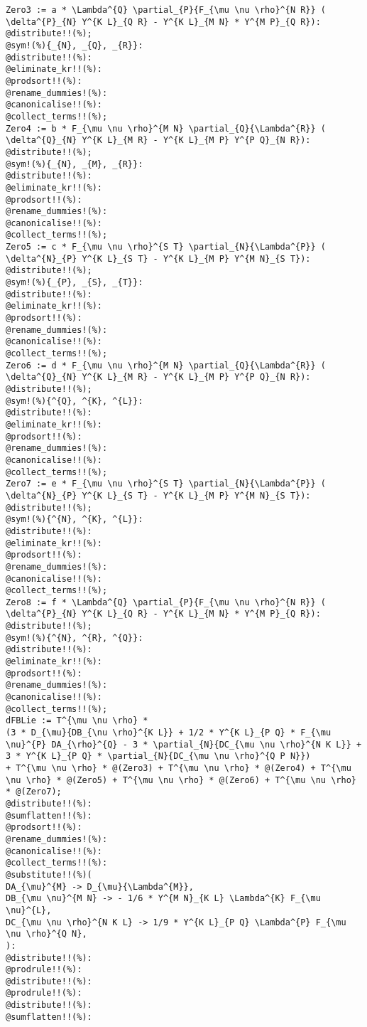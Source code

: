 \documentclass[11pt]{article}
\begin{document}
{\color[named]{Blue}\begin{verbatim}
Zero3 := a * \Lambda^{Q} \partial_{P}{F_{\mu \nu \rho}^{N R}} ( \delta^{P}_{N} Y^{K L}_{Q R} - Y^{K L}_{M N} * Y^{M P}_{Q R}):
@distribute!!(%);
@sym!(%){_{N}, _{Q}, _{R}}:
@distribute!!(%):
@eliminate_kr!!(%):
@prodsort!!(%):
@rename_dummies!(%):
@canonicalise!!(%):
@collect_terms!!(%);
Zero4 := b * F_{\mu \nu \rho}^{M N} \partial_{Q}{\Lambda^{R}} ( \delta^{Q}_{N} Y^{K L}_{M R} - Y^{K L}_{M P} Y^{P Q}_{N R}):
@distribute!!(%);
@sym!(%){_{N}, _{M}, _{R}}:
@distribute!!(%):
@eliminate_kr!!(%):
@prodsort!!(%):
@rename_dummies!(%):
@canonicalise!!(%):
@collect_terms!!(%);
Zero5 := c * F_{\mu \nu \rho}^{S T} \partial_{N}{\Lambda^{P}} ( \delta^{N}_{P} Y^{K L}_{S T} - Y^{K L}_{M P} Y^{M N}_{S T}):
@distribute!!(%);
@sym!(%){_{P}, _{S}, _{T}}:
@distribute!!(%):
@eliminate_kr!!(%):
@prodsort!!(%):
@rename_dummies!(%):
@canonicalise!!(%):
@collect_terms!!(%);
Zero6 := d * F_{\mu \nu \rho}^{M N} \partial_{Q}{\Lambda^{R}} ( \delta^{Q}_{N} Y^{K L}_{M R} - Y^{K L}_{M P} Y^{P Q}_{N R}):
@distribute!!(%);
@sym!(%){^{Q}, ^{K}, ^{L}}:
@distribute!!(%):
@eliminate_kr!!(%):
@prodsort!!(%):
@rename_dummies!(%):
@canonicalise!!(%):
@collect_terms!!(%);
Zero7 := e * F_{\mu \nu \rho}^{S T} \partial_{N}{\Lambda^{P}} ( \delta^{N}_{P} Y^{K L}_{S T} - Y^{K L}_{M P} Y^{M N}_{S T}):
@distribute!!(%);
@sym!(%){^{N}, ^{K}, ^{L}}:
@distribute!!(%):
@eliminate_kr!!(%):
@prodsort!!(%):
@rename_dummies!(%):
@canonicalise!!(%):
@collect_terms!!(%);
Zero8 := f * \Lambda^{Q} \partial_{P}{F_{\mu \nu \rho}^{N R}} ( \delta^{P}_{N} Y^{K L}_{Q R} - Y^{K L}_{M N} * Y^{M P}_{Q R}):
@distribute!!(%);
@sym!(%){^{N}, ^{R}, ^{Q}}:
@distribute!!(%):
@eliminate_kr!!(%):
@prodsort!!(%):
@rename_dummies!(%):
@canonicalise!!(%):
@collect_terms!!(%);
dFBLie := T^{\mu \nu \rho} * 
(3 * D_{\mu}{DB_{\nu \rho}^{K L}} + 1/2 * Y^{K L}_{P Q} * F_{\mu \nu}^{P} DA_{\rho}^{Q} - 3 * \partial_{N}{DC_{\mu \nu \rho}^{N K L}} + 3 * Y^{K L}_{P Q} * \partial_{N}{DC_{\mu \nu \rho}^{Q P N}})
+ T^{\mu \nu \rho} * @(Zero3) + T^{\mu \nu \rho} * @(Zero4) + T^{\mu \nu \rho} * @(Zero5) + T^{\mu \nu \rho} * @(Zero6) + T^{\mu \nu \rho} * @(Zero7);
@distribute!!(%):
@sumflatten!!(%):
@prodsort!!(%):
@rename_dummies!(%):
@canonicalise!!(%):
@collect_terms!!(%):
@substitute!!(%)(
DA_{\mu}^{M} -> D_{\mu}{\Lambda^{M}},
DB_{\mu \nu}^{M N} -> - 1/6 * Y^{M N}_{K L} \Lambda^{K} F_{\mu \nu}^{L},
DC_{\mu \nu \rho}^{N K L} -> 1/9 * Y^{K L}_{P Q} \Lambda^{P} F_{\mu \nu \rho}^{Q N},
):
@distribute!!(%):
@prodrule!!(%):
@distribute!!(%):
@prodrule!!(%):
@distribute!!(%):
@sumflatten!!(%):

\end{verbatim}}
\end{document}
